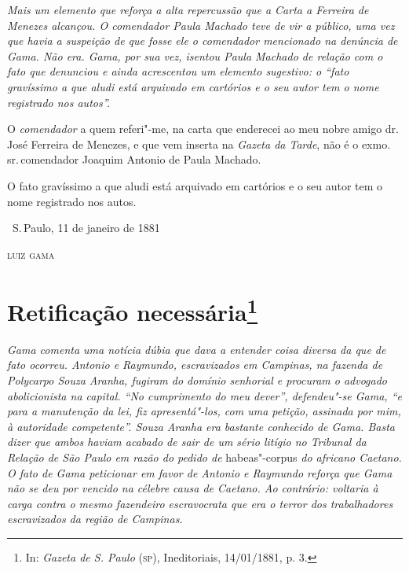 \begin{flushleft}
{\footnotesize\itshape
Mais um elemento que reforça a alta repercussão que a Carta a
Ferreira de Menezes alcançou. O comendador Paula Machado teve de vir a
público, uma vez que havia a suspeição de que fosse ele o comendador
mencionado na denúncia de Gama. Não era. Gama, por sua vez, isentou
Paula Machado de relação com o fato que denunciou e ainda acrescentou um
elemento sugestivo: o ``fato gravíssimo a que aludi está arquivado em
cartórios e o seu autor tem o nome registrado nos autos''. }
\end{flushleft}

O \emph{comendador} a quem referi"-me, na carta que enderecei ao meu
nobre amigo dr.\,José Ferreira de Menezes, e que vem inserta na
\emph{Gazeta da Tarde}, não é o exmo.\,sr.\,comendador Joaquim Antonio de
Paula Machado.

O fato gravíssimo a que aludi está arquivado em cartórios e o seu autor
tem o nome registrado nos autos.

\bigskip

\hfill\ S.\,Paulo, 11 de janeiro de 1881

\hfill\textsc{luiz gama}


\chapter{Retificação necessária\footnote[*]{In: \emph{Gazeta de S.
  Paulo} (\textsc{sp}), Ineditoriais, 14/01/1881, p. 3.}}

\begin{flushleft}
{\footnotesize\itshape
Gama comenta uma notícia dúbia que dava a entender coisa diversa
da que de fato ocorreu. Antonio e Raymundo, escravizados em Campinas, na
fazenda de Polycarpo Souza Aranha, fugiram do domínio senhorial e
procuram o advogado abolicionista na capital. ``No cumprimento do meu
dever'', defendeu"-se Gama, ``e para a manutenção da lei, fiz
apresentá"-los, com uma petição, assinada por mim, à autoridade
competente''. Souza Aranha era bastante conhecido de Gama. Basta dizer
que ambos haviam acabado de sair de um sério litígio no Tribunal da
Relação de São Paulo em razão do pedido de} habeas"-corpus \emph{do
africano Caetano. O fato de Gama peticionar em favor de Antonio e
Raymundo reforça que Gama não se deu por vencido na célebre causa de
Caetano. Ao contrário: voltaria à carga contra o mesmo fazendeiro
escravocrata que era o terror dos trabalhadores escravizados da região
de Campinas. }
\end{flushleft}

